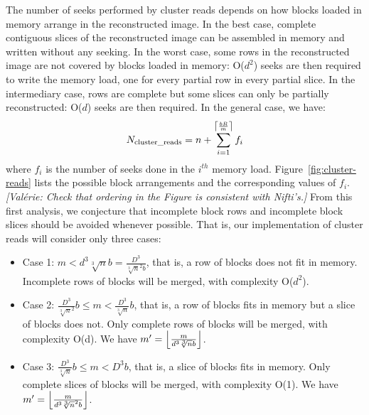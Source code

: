 \documentclass[10pt, conference, compsocconf]{IEEEtran}
\DeclarePairedDelimiter{\ceil}{\lceil}{\rceil}
\DeclarePairedDelimiter{\floor}{\lfloor}{\rfloor}
\newcommand{\todo}[1]{
  \color{red}\emph{[#1]}
  \color{black}
}
\begin{document}
The number of seeks performed by cluster reads depends on how blocks
loaded in memory arrange in the reconstructed image. In the best case,
complete contiguous slices of the reconstructed image can be assembled
in memory and written without any seeking. In the worst case, some
rows in the reconstructed image are not covered by blocks loaded in
memory: O($d^2$) seeks are then required to write the memory load, one
for every partial row in every partial slice. In the intermediary
case, rows are complete but some slices can only be partially
reconstructed: O($d$) seeks are then
required. In the general case, we have:
\begin{equation}
  N_\mathrm{cluster\_reads}= n + \sum_{i=1}^{\ceil*{\frac{bR}{m}}}f_i
\end{equation}
where $f_i$ is the number of seeks done in the $i^{th}$ memory
load. Figure~\ref{fig:cluster-reads} lists the possible block
arrangements and the corresponding values of $f_i$. \todo{Val\'erie:
  Check that ordering in the Figure is consistent with Nifti's.}  From
this first analysis, we conjecture that incomplete block rows and
incomplete block slices should be avoided whenever possible. That is,
our implementation of cluster reads will consider only three cases:
\begin{itemize}
  \item Case 1: $m<d^3\sqrt[3]{n}b=\frac{D^3}{\sqrt[3]{n}^2b}$, that is, a
    row of blocks does not fit in memory. Incomplete rows of
    blocks will be merged, with complexity O($d^2$).
  \item Case 2: $\frac{D^3}{\sqrt[3]{n}^2}b\leq m<\frac{D^3}{\sqrt[3]{n}}b$,
    that is, a row of blocks fits in memory but a slice of blocks does
    not. Only complete rows of blocks will be merged, with
    complexity O(d). We have $m'=\floor*{\frac{m}{d^3\sqrt[3]{n}b}}$.
    \item Case 3: $\frac{D^3}{\sqrt[3]{n}}b \leq m < D^3b$, that is, a slice
      of blocks fits in memory. Only complete slices of blocks
      will be merged, with complexity O(1). We have
      $m'=\floor*{\frac{m}{d^3\sqrt[3]{n}^2b}}$.
\end{itemize}
\end{document}

